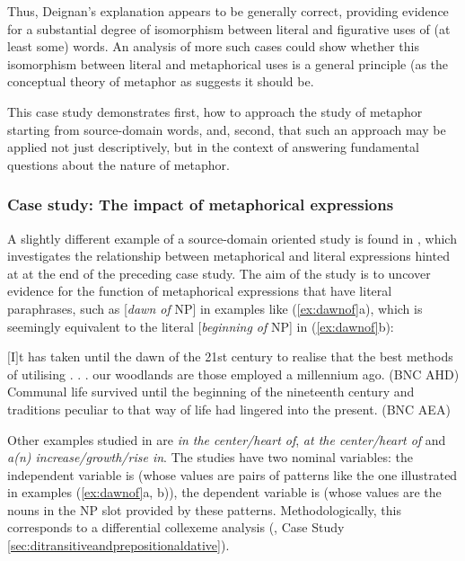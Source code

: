 Thus, Deignan's explanation appears to be generally correct, providing evidence for a substantial degree of isomorphism between literal  and figurative  uses of (at least some) words. An analysis of more such cases could show whether this isomorphism between literal and metaphorical  uses is a general principle (as the conceptual  theory of metaphor as \citet{lakoff_contemporary_1993} suggests it should be.

This case study demonstrates first, how to approach the study of metaphor starting from source\hyp{}domain words, and, second, that such an approach may be applied not just descriptively,  but in the context of answering fundamental questions about the nature of  metaphor.

\subsubsection{Case study: The impact of metaphorical expressions}
\label{sec:theimpactofmetaphoricalexpressions}

A slightly different example of a source\hyp{}domain oriented study is found in \citet{stefanowitsch_function_2005}, which investigates the relationship between metaphorical and literal  expressions hinted at at the end of the preceding case study. The aim of the study is to uncover evidence for the function of metaphorical  expressions that have literal paraphrases, such as [\textit{dawn of} NP] in examples like (\ref{ex:dawnof}a), which is seemingly equivalent to the literal  [\textit{beginning of} NP] in (\ref{ex:dawnof}b):

\begin{exe}
\ex
\begin{xlist}
\label{ex:dawnof}
\ex $[$I$]$t has taken until the dawn of the 21st century to realise that the best methods of utilising . . . our woodlands are those employed a millennium ago. (BNC AHD)
\ex Communal life survived until the beginning of the nineteenth century and traditions peculiar to that way of life had lingered into the present. (BNC AEA)
\end{xlist}
\end{exe}

Other examples studied in \citet{stefanowitsch_function_2005} are \textit{in the center\slash heart of}, \textit{at the center\slash heart of} and \textit{a(n) increase\slash growth\slash rise in}. The studies have two nominal  variables: the independent variable is  (whose values are pairs of patterns like the one illustrated in examples (\ref{ex:dawnof}a, b)), the dependent variable is  (whose values are the nouns in the NP slot provided by these patterns. Methodologically, this corresponds to a differential collexeme  analysis (, Case Study \ref{sec:ditransitiveandprepositionaldative}).

